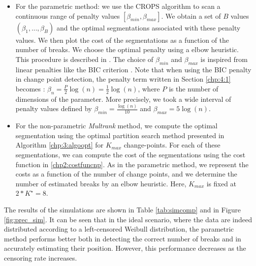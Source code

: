     \begin{itemize}
        \item For the parametric method: we use the CROPS algorithm to scan a continuous range of penalty values $[\beta_{min},\beta_{max}]$. We obtain a set of $B$ values $(\hat \beta_1,...,\beta_B)$ and the optimal segmentations associated with these penalty values. We then plot the cost of the segmentations as a function of the number of breaks. We choose the optimal penalty using a elbow heuristic. This procedure is described in \cite{haynes2014}. The choice of $\beta_{min}$ and $\beta_{max}$ is inspired from linear penalties like the BIC criterion \cite{YAO1988181}. Note that when using the BIC penalty in change point detection, the penalty term written in Section \ref{chp:4:1} becomes : $\beta_n = \frac{P}{2}\log(n) = \frac{1}{2}\log(n)$, where $P$ is the number of dimensions of the parameter. More precisely, we took a wide interval of penalty values defined by $\beta_{min} = \frac{\log(n)}{10}$ and $\beta_{max} = 5\log(n)$.
        \item For the non-parametric \textit{Multrank} method, we compute the optimal segmentation using the optimal partition search method presented in Algorithm \ref{chp:3:algoopt} for $K_{max}$ change-points. For each of these segmentations, we can compute the cost of the segmentations using the cost function in \eqref{chp2:costfuncnp}. As in the parametric method, we represent the costs as a function of the number of change points, and we determine the number of estimated breaks by an elbow heuristic. Here, $K_{max}$ is fixed at $2*K^\star = 8$.
    \end{itemize}
The results of the simulations are shown in Table \ref{tab:simcomp} and in Figure \ref{fig:prec_sim}. It can be seen that in the ideal scenario, where the data are indeed distributed according to a left-censored Weibull distribution, the parametric method performs better both in detecting the correct number of breaks and in accurately estimating their position. However, this performance decreases as the censoring rate increases.


